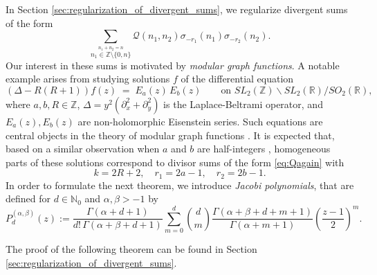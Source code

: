 \documentclass[]{article}
\begin{document}
In Section \ref{sec:regularization_of_divergent_sums}, we regularize divergent sums of the form 
\begin{equation}\label{eq:Qagain}
 \sum_{\stackrel{n_1+n_2 = n}{n_1 \in \mathbb{Z} \setminus \{ 0, n \} }}  \mathcal{Q}(n_1,n_2)  \sigma_{-r_1}(n_1) \sigma_{-r_2}(n_2).\end{equation}
Our interest in these sums is motivated by \textit{modular graph functions}.  A notable example arises from studying solutions \(f\) of the differential equation  
\begin{equation}\label{eq:DE}
    (\Delta - R(R+1)) f(z) \;=\; E_a(z)\,E_b(z) 
    \qquad \text{on } SL_2(\mathbb{Z}) \backslash SL_2(\mathbb{R}) / SO_2(\mathbb{R}),
\end{equation}
where \(a,b,R \in \mathbb{Z}\), \(\Delta = y^2(\partial_x^2+\partial_y^2)\) is the Laplace-Beltrami operator, 
and \(E_a(z), E_b(z)\) are non-holomorphic Eisenstein series. Such equations are central objects in the theory of modular graph functions \cites{DKS2021_1, DKS2021_2}.
 It is expected that, based on a similar observation when $a$ and $b$ are half-integers \cites{CGPWW2021, FKLR}, homogeneous parts of these solutions correspond to divisor sums of the form \eqref{eq:Qagain} with  
\begin{equation}\label{eq:modular_graph_numbers1}
    k = 2 R + 2, \quad r_1 = 2 a - 1, \quad r_2 = 2 b - 1.
\end{equation}
In order to formulate the next theorem, we %
introduce \textit{Jacobi polynomials}, that are defined for $d \in \mathbb{N}_0$ and $\alpha, \beta > -1$ \cite[Table 18.3.1]{NIST} by 
\begin{equation}
P^{(\alpha, \beta)}_d(z):= \frac{\Gamma(\alpha +d+1)}{d!\,\Gamma(\alpha+\beta+d+1)}\sum_{m=0}^d {d\choose m}\frac{\Gamma(\alpha+\beta+d+m+1)}{\Gamma(\alpha+m+1)}\left(\frac{z-1}{2}\right)^m.
\end{equation} 


The proof of the following theorem can be found in Section \ref{sec:regularization_of_divergent_sums}.
\end{document}
